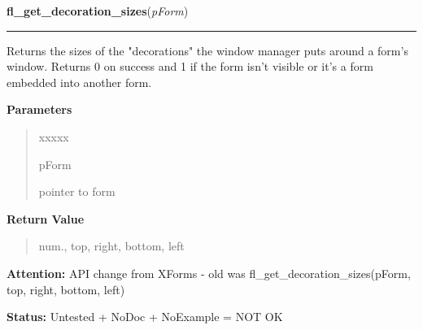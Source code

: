 \hspace{.8\funcindent}\begin{boxedminipage}{\funcwidth}

    \raggedright \textbf{fl\_get\_decoration\_sizes}(\textit{pForm})

    \vspace{-1.5ex}

    \rule{\textwidth}{0.5\fboxrule}
\setlength{\parskip}{2ex}
    Returns the sizes of the "decorations" the window manager puts around a
    form's window. Returns 0 on success and 1 if the form isn't visible or 
    it's a form embedded into another form.

\setlength{\parskip}{1ex}
      \textbf{Parameters}
      \vspace{-1ex}

      \begin{quote}
        \begin{Ventry}{xxxxx}

          \item[pForm]

          pointer to form

        \end{Ventry}

      \end{quote}

      \textbf{Return Value}
    \vspace{-1ex}

      \begin{quote}
      num., top, right, bottom, left

      \end{quote}

\textbf{Attention:} API change from XForms - old was fl\_get\_decoration\_sizes(pForm, top, 
right, bottom, left)



\textbf{Status:} Untested + NoDoc + NoExample = NOT OK



    \end{boxedminipage}

    \label{xformslib:library:fl_raise_form}

    \vspace{0.5ex}

